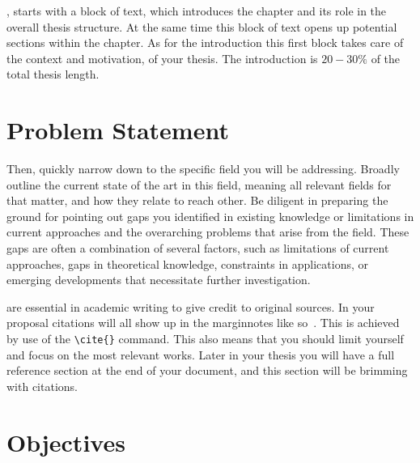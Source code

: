 , starts with a block of text, which introduces the chapter and its role in the overall thesis structure. 
At the same time this block of text opens up potential sections within the chapter. As for the introduction this first block takes care 
of the context and motivation, of your thesis. The introduction is $20 - 30\%$ of the total thesis length. 


\bigskip
\section{Problem Statement}\label{sec:ProblemStatement}
 Then, quickly narrow down to the specific field you will be addressing.
Broadly outline the current state of the art in this field, meaning all relevant fields for that matter, and how they relate to reach other. Be diligent in preparing the ground for pointing out
gaps you identified in existing knowledge or limitations in current approaches and the overarching problems that arise from the field. 
These gaps are often a combination of several factors, such as limitations of current approaches, gaps in theoretical knowledge, constraints in applications, 
or emerging developments that necessitate further investigation. 

 are essential in academic writing to give credit to original sources. 
In your proposal citations will all show up in the marginnotes like so~\cite{SchuteraBachelorThesis}.
This is achieved by use of the \texttt{\textbackslash cite\{\}} command. This also means that you should limit yourself and focus
on the most relevant works. Later in your thesis you will have a full reference section at the end of your document, and this section will be brimming with citations.

\vfill
\section{Objectives}\label{sec:Objectives}


